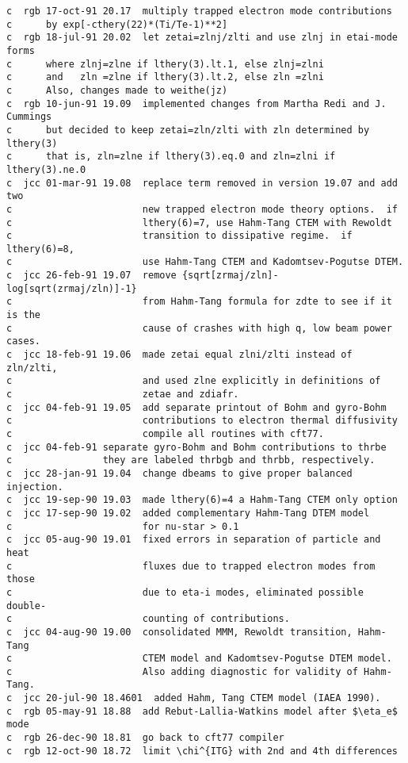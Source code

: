 \begin{verbatim}
c  rgb 17-oct-91 20.17  multiply trapped electron mode contributions
c      by exp[-cthery(22)*(Ti/Te-1)**2]
c  rgb 18-jul-91 20.02  let zetai=zlnj/zlti and use zlnj in etai-mode forms
c      where zlnj=zlne if lthery(3).lt.1, else zlnj=zlni
c      and   zln =zlne if lthery(3).lt.2, else zln =zlni
c      Also, changes made to weithe(jz) 
c  rgb 10-jun-91 19.09  implemented changes from Martha Redi and J. Cummings
c      but decided to keep zetai=zln/zlti with zln determined by lthery(3)
c      that is, zln=zlne if lthery(3).eq.0 and zln=zlni if lthery(3).ne.0
c  jcc 01-mar-91 19.08  replace term removed in version 19.07 and add two
c                       new trapped electron mode theory options.  if
c                       lthery(6)=7, use Hahm-Tang CTEM with Rewoldt
c                       transition to dissipative regime.  if lthery(6)=8,
c                       use Hahm-Tang CTEM and Kadomtsev-Pogutse DTEM.
c  jcc 26-feb-91 19.07  remove {sqrt[zrmaj/zln]-log[sqrt(zrmaj/zln)]-1}
c                       from Hahm-Tang formula for zdte to see if it is the
c                       cause of crashes with high q, low beam power cases.
c  jcc 18-feb-91 19.06  made zetai equal zlni/zlti instead of zln/zlti,
c                       and used zlne explicitly in definitions of 
c                       zetae and zdiafr.
c  jcc 04-feb-91 19.05  add separate printout of Bohm and gyro-Bohm
c                       contributions to electron thermal diffusivity
c                       compile all routines with cft77.
c  jcc 04-feb-91 separate gyro-Bohm and Bohm contributions to thrbe
c                they are labeled thrbgb and thrbb, respectively.
c  jcc 28-jan-91 19.04  change dbeams to give proper balanced injection.
c  jcc 19-sep-90 19.03  made lthery(6)=4 a Hahm-Tang CTEM only option
c  jcc 17-sep-90 19.02  added complementary Hahm-Tang DTEM model
c                       for nu-star > 0.1        
c  jcc 05-aug-90 19.01  fixed errors in separation of particle and heat
c                       fluxes due to trapped electron modes from those
c                       due to eta-i modes, eliminated possible double-
c                       counting of contributions.
c  jcc 04-aug-90 19.00  consolidated MMM, Rewoldt transition, Hahm-Tang
c                       CTEM model and Kadomtsev-Pogutse DTEM model.
c                       Also adding diagnostic for validity of Hahm-Tang.
c  jcc 20-jul-90 18.4601  added Hahm, Tang CTEM model (IAEA 1990).
c  rgb 05-may-91 18.88  add Rebut-Lallia-Watkins model after $\eta_e$ mode
c  rgb 26-dec-90 18.81  go back to cft77 compiler
c  rgb 12-oct-90 18.72  limit \chi^{ITG} with 2nd and 4th differences

\end{verbatim}
